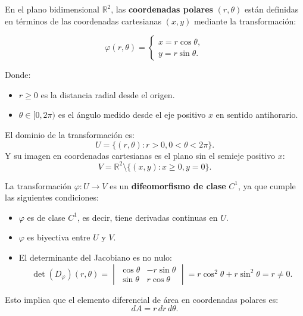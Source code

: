     \begin{definición}
    En el plano bidimensional $\mathbb{R}^2$, las \textbf{coordenadas polares} $(r, \theta)$ están definidas en términos de las coordenadas cartesianas $(x, y)$ mediante la transformación:
    
    \begin{minipage}{0.5\textwidth}
        \[
            \varphi(r, \theta) =
            \begin{cases}
                x = r\cos\theta, \\
                y = r\sin\theta.
            \end{cases}
        \]
    \end{minipage}
    \begin{minipage}{0.5\textwidth}
        \centering
        
    \end{minipage}
    
    Donde:
    \begin{itemize}
        \item $r \geq 0$ es la distancia radial desde el origen.
        \item $\theta \in [0, 2\pi)$ es el ángulo medido desde el eje positivo $x$ en sentido antihorario.
    \end{itemize}
    
    El dominio de la transformación es: $$ U = \{(r, \theta) : r > 0, 0 < \theta <
        2\pi\}. $$ Y su imagen en coordenadas cartesianas es el plano sin el semieje
    positivo $x$: $$ V = \mathbb{R}^2 \setminus \{ (x,y) : x \geq 0, y = 0\}. $$
    
    La transformación $\varphi: U \to V$ es un \textbf{difeomorfismo de clase}
    $C^1$, ya que cumple las siguientes condiciones:
    \begin{itemize}
        \item $\varphi$ es de clase $C^1$, es decir, tiene derivadas continuas en $U$.
        \item $\varphi$ es biyectiva entre $U$ y $V$.
        \item El determinante del Jacobiano es no nulo: $$ \det(D_{\varphi})(r, \theta) =
                  \begin{vmatrix}
                      \cos\theta & -r\sin\theta \\
                      \sin\theta & r\cos\theta
                  \end{vmatrix} = r\cos^2\theta + r\sin^2\theta = r \neq 0.
              $$
    \end{itemize}
    Esto implica que el elemento diferencial de área en coordenadas polares es:
    $$
        dA = r \, dr \, d\theta.
    $$
    \end{definición}
    
